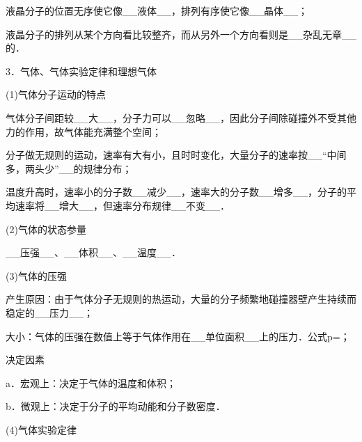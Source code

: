液晶分子的位置无序使它像\_\_液体\_\_，排列有序使它像\_\_晶体\_\_；

液晶分子的排列从某个方向看比较整齐，而从另外一个方向看则是\_\_杂乱无章\_\_的．

3．气体、气体实验定律和理想气体

(1)气体分子运动的特点

气体分子间距较\_\_大\_\_，分子力可以\_\_忽略\_\_，因此分子间除碰撞外不受其他力的作用，故气体能充满整个空间；

分子做无规则的运动，速率有大有小，且时时变化，大量分子的速率按\_\_``中间多，两头少''\_\_的规律分布；

温度升高时，速率小的分子数\_\_减少\_\_，速率大的分子数\_\_增多\_\_，分子的平均速率将\_\_增大\_\_，但速率分布规律\_\_不变\_\_．

(2)气体的状态参量

\_\_压强\_\_、\_\_体积\_\_、\_\_温度\_\_．

(3)气体的压强

产生原因：由于气体分子无规则的热运动，大量的分子频繁地碰撞器壁产生持续而稳定的\_\_压力\_\_；

大小：气体的压强在数值上等于气体作用在\_\_单位面积\_\_上的压力．公式p=；

决定因素

a．宏观上：决定于气体的温度和体积；

b．微观上：决定于分子的平均动能和分子数密度．

(4)气体实验定律

